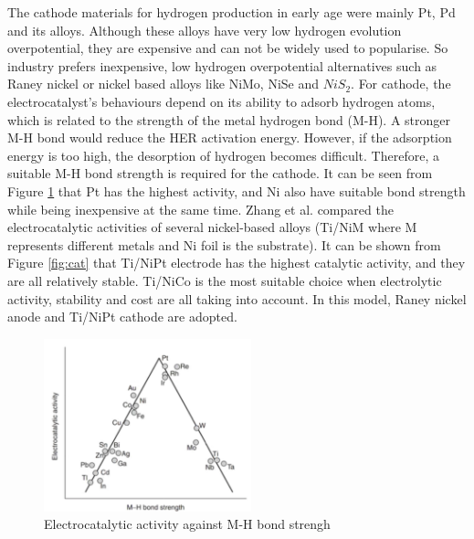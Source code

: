 \documentclass[11pt, a4paper]{article}
\begin{document}
The cathode materials for hydrogen production in early age were mainly Pt, Pd and its alloys. Although these alloys have very low hydrogen evolution overpotential, they are expensive and can not be widely used to popularise.  So industry prefers inexpensive, low hydrogen overpotential alternatives such as Raney nickel or nickel based alloys like NiMo, NiSe and $NiS_2$. For cathode, the electrocatalyst's behaviours depend on its ability to adsorb hydrogen atoms, which is related to the strength of the metal hydrogen bond (M-H). \cite{cathode2}A stronger M-H bond would reduce the HER activation energy. However, if the adsorption energy is too high, the desorption of hydrogen becomes difficult. Therefore, a suitable M-H bond strength is required for the cathode. It can be seen from Figure \ref{fig:ca} that Pt has the highest activity, and Ni also have suitable bond strength while being inexpensive at the same time.  Zhang et al.\cite{cathode} compared the electrocatalytic activities of several nickel-based alloys (Ti/NiM where M represents different metals and Ni foil is the substrate). It can be shown from Figure \ref{fig:cat} that Ti/NiPt electrode has the highest catalytic activity, and they are all relatively stable. Ti/NiCo is the most suitable choice when electrolytic activity, stability and cost are all taking into account. In this model, Raney nickel anode and Ti/NiPt cathode are adopted.
\begin{figure}[H] 
\centering
\includegraphics[width=6cm]{catalyst.png}
\caption{Electrocatalytic activity against M-H bond strengh\cite{cathode2}}
\label{fig:ca}
\end{figure}
 
\end{document}
